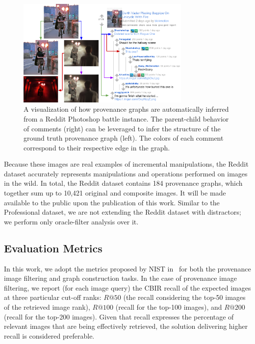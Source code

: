 \begin{figure}[t]
\centering
\includegraphics[width=8.5cm]{figures/Reddit_Inference.pdf}
\caption[]{A visualization of how provenance graphs are automatically inferred from a Reddit Photoshop battle instance.
The parent-child behavior of comments (right) can be leveraged to infer the structure of the ground truth provenance graph (left).
The colors of each comment correspond to their respective edge in the graph.} %
\label{fig:redditViz}
\end{figure}

Because these images are real examples of incremental manipulations, the Reddit dataset accurately represents manipulations and operations performed on images in the wild.
In total, the Reddit dataset contains 184 provenance graphs, which together sum up to 10,421 original and composite images.
It will be made available to the public upon the publication of this work.
Similar to the Professional dataset, we are not extending the Reddit dataset with distractors; we perform only oracle-filter analysis over it.


\subsection{Evaluation Metrics}
\label{sec:exp_metrics}

In this work, we adopt the metrics proposed by NIST in~\cite{nist2017dataset} for both the provenance image filtering and graph construction tasks.
In the case of provenance image filtering, we report (for each image query) the CBIR recall of the expected images at three particular cut-off ranks: $R@50$ (the recall considering the top-50 images of the retrieved image rank), $R@100$ (recall for the top-100 images), and $R@200$ (recall for the top-200 images).
Given that recall expresses the percentage of relevant images that are being effectively retrieved, the solution delivering higher recall is considered preferable.

